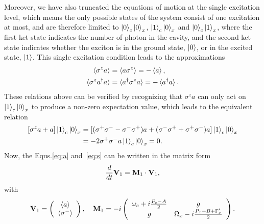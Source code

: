 Moreover, we have also truncated the equations of motion at the single excitation level, which means the only possible states of the system consist of one excitation at most, and are therefore limited to $\mathinner{|{0}\rangle}_c\mathinner{|{0}\rangle}_x$, $\mathinner{|{1}\rangle}_c\mathinner{|{0}\rangle}_x$ and $\mathinner{|{0}\rangle}_c\mathinner{|{1}\rangle}_x$, where the first ket state indicates the number of photon in the cavity, and the second ket state indicates whether the exciton is in the ground state, $\mathinner{|{0}\rangle}$, or in the excited state, $\mathinner{|{1}\rangle}$. This single excitation condition leads to the approximations
\begin{align}
\mathinner{\langle{\sigma^za}\rangle}&=\mathinner{\langle{a\sigma^z}\rangle}=-\mathinner{\langle{a}\rangle},\\
\mathinner{\langle{\sigma^za^{\dagger}a}\rangle}&=\mathinner{\langle{a^{\dagger}\sigma^z a}\rangle}=-\mathinner{\langle{a^{\dagger}a}\rangle}.
\end{align}
These relations above can be verified by recognizing that $\sigma^za$ can only act on $\mathinner{|{1}\rangle}_c\mathinner{|{0}\rangle}_x$ to produce a non-zero expectation value, which leads to the equivalent relation
\begin{equation}
\begin{split}
[\sigma^z a+a]\mathinner{|{1}\rangle}_c\mathinner{|{0}\rangle}_x
&=[(\sigma^{+}\sigma^{-}-\sigma^{-}\sigma^{+})a+(\sigma^{-}\sigma^{+}+\sigma^{+}\sigma^{-})a]\mathinner{|{1}\rangle}_c\mathinner{|{0}\rangle}_x\\
&=-2\sigma^{+}\sigma^{-} a\mathinner{|{1}\rangle}_c\mathinner{|{0}\rangle}_x=0.
\end{split}
\end{equation}
Now, the Equs.\eqref{eq:a} and~\eqref{eq:s} can be written in the matrix form
\begin{equation}\label{eq:V1}
\frac{d}{dt}\mathbf{V}_1=\mathbf{M}_1\cdot\mathbf{V}_1,
\end{equation}
with
\begin{equation}
\mathbf{V}_1=\left(\begin{array}{c}\mathinner{\langle{a}\rangle}\\ \mathinner{\langle{\sigma^{-}}\rangle} \end{array}\right), \quad
\mathbf{M}_1=-i\left(\begin{array}{cc}
\omega_c+i\frac{P_c-A}{2} & g\\
g & \Omega_x-i\frac{P_x+B+\Gamma_x^{\prime}}{2}\end{array} \right).
\end{equation}

